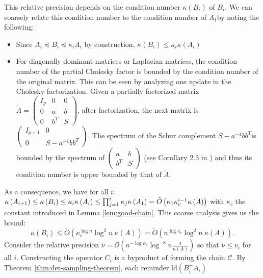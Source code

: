 This relative precision depends on the condition number $\kappa\left(B_{i}\right)$
of $B_{i}$. We can coarsely relate this condition number to the condition
number of $A_{1}$by noting the following: 
\begin{itemize}
\item Since $A_{i}\preceq B_{i}\preceq\kappa_{i}A_{i}$ by construction,
$\kappa\left(B_{i}\right)\leq\kappa_{i}\kappa\left(A_{i}\right)$ 
\item For diagonally dominant matrices or Laplacian matrices, the condition
number of the partial Cholesky factor is bounded by the condition
number of the original matrix. This can be seen by analyzing one update
in the Cholesky factorization. Given a partially factorized matrix
$\tilde{A}=\left(\begin{array}{ccc}
I_{p} & 0 & 0\\
0 & a & b\\
0 & b^{T} & S
\end{array}\right)$, after factorization, the next matrix is $\left(\begin{array}{cc}
I_{p+1} & 0\\
0 & S-a^{-1}bb^{T}
\end{array}\right)$. The spectrum of the Schur complement $S-a^{-1}bb^{T}$is bounded
by the spectrum of $\left(\begin{array}{cc}
a & b\\
b^{T} & S
\end{array}\right)$ (see Corollary 2.3 in \cite{Zhang2005}) and thus its condition number
is upper bounded by that of $\tilde{A}$. 
\end{itemize}
As a consequence, we have for all $i$: $\kappa\left(A_{i+1}\right)\leq\kappa\left(B_{i}\right)\leq\kappa_{i}\kappa\left(A_{i}\right)\leq\prod_{j=1}^{i}\kappa_{j}\kappa\left(A_{1}\right) \\*=\tilde{O}\left(\kappa_{1}\kappa_{c}^{i-1}\kappa\left(A\right)\right)$
with $\kappa_{c}$ the constant introduced in Lemma \ref{lem:good-chain}.
This coarse analysis gives us the bound: 
\[
\kappa\left(B_{i}\right)\leq\tilde{O}\left(\kappa_{c}^{\log n}\log^{2}n~\kappa\left(A\right)\right)=\tilde{O}\left(n^{\log\kappa_{c}}\log^{2}n\ \kappa\left(A\right)\right).
\]
Consider the relative precision $\tilde{\nu}=\tilde{\mathcal{O}}\left(n^{-\log\kappa_{c}}\log^{-8}n\frac{\epsilon}{\kappa\left(A\right)}\right)$
so that $\tilde{\nu}\leq\nu_{i}$ for all $i$. Constructing the operator
$C_{i}$ is a byproduct of forming the chain \emph{$\mathcal{C}$.
}By Theorem \ref{thm:det-sampling-theorem}, each reminder $\text{ld}\left(B_{i}^{+}A_{i}\right)$
